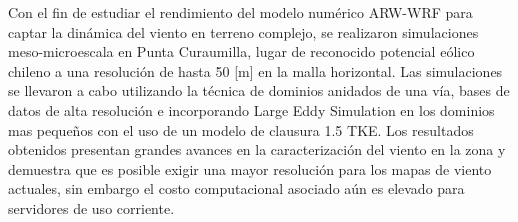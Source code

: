 Con el fin de estudiar el rendimiento del modelo numérico ARW-WRF para captar la dinámica del viento en terreno complejo, se realizaron simulaciones meso-microescala en Punta Curaumilla, lugar de reconocido potencial eólico chileno a una resolución de hasta 50 [m] en la malla horizontal. Las simulaciones se llevaron a cabo utilizando la técnica de dominios anidados de una vía, bases de datos de alta resolución e incorporando Large Eddy Simulation en los dominios mas pequeños con el uso de un modelo de clausura 1.5 TKE. Los resultados obtenidos presentan grandes avances en la caracterización del viento en la zona y demuestra que es posible exigir una mayor resolución para los mapas de viento actuales, sin embargo el costo computacional asociado aún es elevado para servidores de uso corriente.